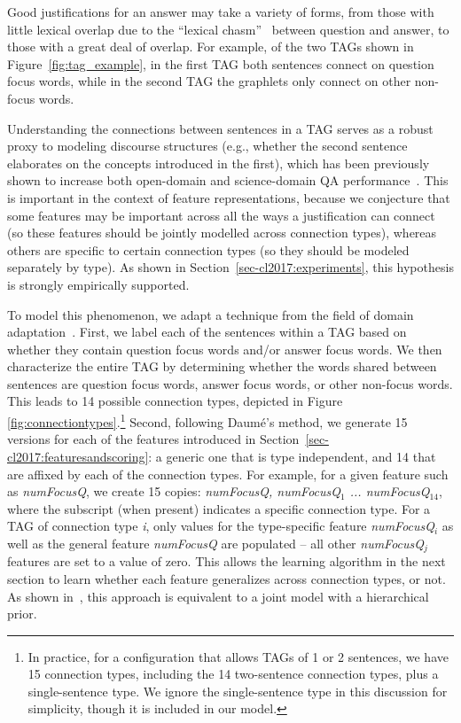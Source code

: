 Good justifications for an answer may take a variety of forms, from those with little lexical overlap due to the ``lexical chasm''~\cite{Berger:00} between question and answer, to those with a great deal of overlap. For example, of the two TAGs shown in Figure~\ref{fig:tag_example}, in the first TAG both sentences connect on question focus words, while in the second TAG the graphlets only connect on other non-focus words. 

Understanding the connections between sentences in a TAG serves as a robust proxy to modeling discourse structures (e.g., whether the second sentence elaborates on the concepts introduced in the first), which has been previously shown to increase both open-domain and science-domain QA performance~\cite{jansen14}.
This is important in the context of feature representations, because we conjecture that some features may be important across all the ways a justification can connect (so these features should be jointly modelled across connection types), whereas others are specific to certain connection types (so they should be modeled separately by type). As shown in Section~\ref{sec-cl2017:experiments}, this hypothesis is strongly empirically supported.

To model this phenomenon, we adapt a technique from the field of domain adaptation~\cite{daume2007}.
First, we label each of the sentences within a TAG based on whether they contain question focus words and/or answer focus words.  We then characterize the entire TAG by determining whether the words shared between sentences are question focus words, answer focus words, or other non-focus words.  This leads to 14 possible connection types, depicted in Figure \ref{fig:connectiontypes}.\footnote{In practice, for a configuration that allows TAGs of 1 or 2 sentences, we have 15 connection types, including the 14 two-sentence connection types, plus a single-sentence type. We ignore the single-sentence type in this discussion for simplicity, though it is included in our model.}
Second, following Daum{\'e}'s method, we generate 15 versions for each of the features introduced in Section~\ref{sec-cl2017:featuresandscoring}: a generic one that is type independent, and 14 that are affixed by each of the connection types. For example, for a given feature such as \emph{numFocusQ}, we create 15 copies: \emph{numFocusQ, numFocusQ$_1$ ... numFocusQ$_{14}$}, where the subscript (when present) indicates a specific connection type. For a TAG of connection type \emph{i}, only values for the type-specific feature \emph{numFocusQ$_i$} as well as the general feature \emph{numFocusQ} are populated -- all other \emph{numFocusQ$_j$} features are set to a value of zero. This allows the learning algorithm in the next section to learn whether each feature generalizes across connection types, or not. As shown in~\cite{finkel2010hierarchical}, this approach is equivalent to a joint model with a hierarchical prior. 



